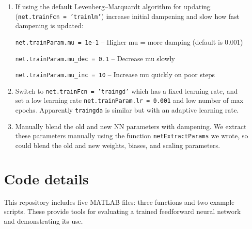 \documentclass[a4paper,12pt]{article}
\newcommand{\code}[1]{\texttt{#1}}
\begin{document}
\begin{itemize}
\begin{enumerate}
\item If using the default Levenberg–Marquardt algorithm for updating (\code{net.trainFcn = 'trainlm'}) increase initial dampening and slow how fast dampening is updated:

\code{net.trainParam.mu = 1e-1}  --  Higher mu = more damping (default is 0.001)

\code{net.trainParam.mu\_dec = 0.1} -- Decrease mu slowly

\code{net.trainParam.mu\_inc = 10} -- Increase mu quickly on poor steps

\item Switch to \code{net.trainFcn = 'traingd'} which has a fixed learning rate, and set a low learning rate \code{net.trainParam.lr = 0.001} and low number of max epochs. Apparently \code{traingda} is similar but with an adaptive learning rate. 

\item Manually blend the old and new NN parameters with dampening. We extract these parameters manually using the function \code{netExtractParams} we wrote, so could blend the old and new weights, biases, and scaling parameters. 

\end{enumerate}

\end{itemize}


\clearpage
\section{Code details}
\label{sec:code}

This repository includes five MATLAB files: three functions and two example scripts. These provide tools for evaluating a trained feedforward neural network and demonstrating its use.
\end{document}

